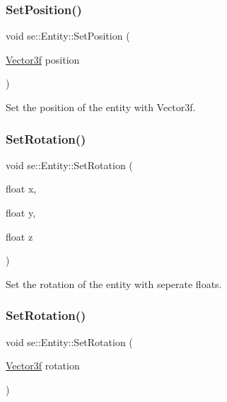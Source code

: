 \subsubsection{\texorpdfstring{Set\+Position()}{SetPosition()}\hspace{0.1cm}{\footnotesize\ttfamily [2/2]}}
{\footnotesize\ttfamily void se\+::\+Entity\+::\+Set\+Position (\begin{DoxyParamCaption}\item[{\mbox{\hyperlink{namespacese_a12e07512d95e2fdebdaf74a5ea2cf5f6}{Vector3f}}}]{position }\end{DoxyParamCaption})}

Set the position of the entity with Vector3f. \mbox{\label{classse_1_1_entity_a41f820b99b2b6d76c97472dcddca7fa2}} 
\subsubsection{\texorpdfstring{Set\+Rotation()}{SetRotation()}\hspace{0.1cm}{\footnotesize\ttfamily [1/2]}}
{\footnotesize\ttfamily void se\+::\+Entity\+::\+Set\+Rotation (\begin{DoxyParamCaption}\item[{float}]{x,  }\item[{float}]{y,  }\item[{float}]{z }\end{DoxyParamCaption})}

Set the rotation of the entity with seperate floats. \mbox{\label{classse_1_1_entity_a950373cfaaad7ad4bba06f3ab8534efd}} 
\subsubsection{\texorpdfstring{Set\+Rotation()}{SetRotation()}\hspace{0.1cm}{\footnotesize\ttfamily [2/2]}}
{\footnotesize\ttfamily void se\+::\+Entity\+::\+Set\+Rotation (\begin{DoxyParamCaption}\item[{\mbox{\hyperlink{namespacese_a12e07512d95e2fdebdaf74a5ea2cf5f6}{Vector3f}}}]{rotation }\end{DoxyParamCaption})}

